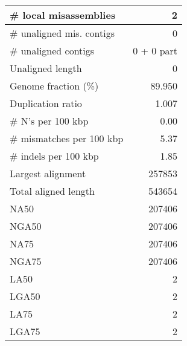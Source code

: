 \documentclass[12pt,a4paper]{article}
\begin{document}
\begin{table}[ht]
\begin{center}
\begin{tabular}{|l*{1}{|r}|}
\# local misassemblies & 2 \\ \hline
\# unaligned mis. contigs & 0 \\ \hline
\# unaligned contigs & 0 + 0 part \\ \hline
Unaligned length & 0 \\ \hline
Genome fraction (\%) & 89.950 \\ \hline
Duplication ratio & 1.007 \\ \hline
\# N's per 100 kbp & 0.00 \\ \hline
\# mismatches per 100 kbp & 5.37 \\ \hline
\# indels per 100 kbp & 1.85 \\ \hline
Largest alignment & 257853 \\ \hline
Total aligned length & 543654 \\ \hline
NA50 & 207406 \\ \hline
NGA50 & 207406 \\ \hline
NA75 & 207406 \\ \hline
NGA75 & 207406 \\ \hline
LA50 & 2 \\ \hline
LGA50 & 2 \\ \hline
LA75 & 2 \\ \hline
LGA75 & 2 \\ \hline
\end{tabular}
\end{center}
\end{table}
\end{document}
